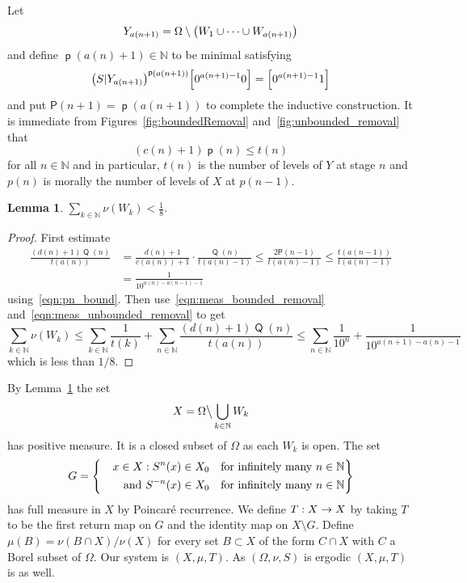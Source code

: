 \documentclass[10pt]{amsart}
\newtheorem{lemm}[theo]{Lemma}\newtheorem{prop}[theo]{Proposition}\newtheorem{coro}[theo]{Corollary}\newtheorem{conj}[theo]{Conjecture}
\theoremstyle{definition}\newtheorem{defi}[theo]{Definition}\newtheorem{rema}[theo]{Remark}\newtheorem{exam}[theo]{Example}\newtheorem{exem}[theo]{Example}\newtheorem{nota}[theo]{Notation}
\DeclareMathOperator{\p}{\mathsf{p}}
\DeclareMathOperator{\Q}{\mathsf{Q}}
\newcommand{\N}{\mathbb{N}}
\renewcommand{\P}{\mathsf{P}}
\let\originalleft\left
\let\originalright\right
\renewcommand{\left}{\mathopen{}\mathclose\bgroup\originalleft}
\renewcommand{\right}{\aftergroup\egroup\originalright}
\renewcommand*{\to}{\mathchoice{\longrightarrow}{\rightarrow}{\rightarrow}{\rightarrow}}
\begin{document}
Let
\[
Y_{a(n+1)} = \Omega \setminus \left(W_1 \cup \dots \cup W_{a(n+1)}\right)
\]
and define $\p(a(n)+1) \in \N$ to be minimal satisfying
\[
\left(S|Y_{a(n+1)}\right)^{\p(a(n+1))}\left[0^{a(n+1)-1} 0\right] = \left[0^{a(n+1) - 1}1\right]
\]
and put $\P(n+1) = \p(a(n+1))$ to complete the inductive construction. It is immediate from Figures~\ref{fig:boundedRemoval} and~\ref{fig:unbounded_removal} that
\begin{equation}\label{eqn:pn_bound}
(c(n) + 1) \p(n) \le t(n)
\end{equation}
for all $n \in \N$ and in particular, $t(n)$ is the number of levels of $Y$ at stage $n$ and $p(n)$ is morally the number of levels of $X$ at $p(n-1)$.

\begin{lemm}\label{lem:removed_mass}
$
\sum_{k \in \N} \nu(W_k) < \frac{1}{8}.
$
\end{lemm}
\begin{proof}
First estimate
\begin{equation}\label{eq:unbounded removal est}
\begin{aligned}
\frac{(d(n)+1) \Q(n)}{t(a(n))} &=
\frac{d(n)+1}{c(a(n))+1} \cdot \frac{\Q(n)}{t(a(n)-1)}
\le
\frac{2\P(n-1)}{t(a(n)-1)}
\le
\frac{t(a(n-1))}{t(a(n)-1)}\\
&=
\frac{1}{10^{a(n) - a(n-1)-1}}
\end{aligned}
\end{equation}
using~\eqref{eqn:pn_bound}. Then use~\eqref{eqn:meas_bounded_removal} and~\eqref{eqn:meas_unbounded_removal} to get
\[
\sum_{k \in \N} \nu(W_k)
\le
\sum_{k \in \N} \frac{1}{t(k)} + \sum_{n \in \N} \frac{(d(n)+1) \Q(n)}{t(a(n))}
\le \sum_{n \in \N} \frac{1}{10^n} + \frac{1}{10^{a(n+1) - a(n)-1}}
\]
which is less than $1/8$.
\end{proof}


By Lemma~\ref{lem:removed_mass} the set
\[
X = \Omega \big\backslash \bigcup_{k \in \N} W_k
\]
has positive measure. It is a closed subset of $\Omega$ as each $W_k$ is open. The set
\[
G =
\left\{
\begin{aligned}
x \in X : S^n(x) \in X_0\quad &\text{for infinitely many } n \in \N\\
\qquad\text{and } S^{-n}(x) \in X_0\quad &\text{for infinitely many } n \in \N
\end{aligned}
\right\}
\]
has full measure in $X$ by Poincaré{} recurrence. We define $T : X \to X$ by taking $T$ to be the first return map on $G$ and the identity map on $X \setminus G$. Define $\mu(B) = \nu(B \cap X) / \nu(X)$ for every set $B \subset X$ of the form $C \cap X$ with $C$ a Borel subset of $\Omega$. Our system is $(X,\mu,T)$. As $(\Omega,\nu,S)$ is ergodic $(X,\mu,T)$ is as well.
\end{document}
